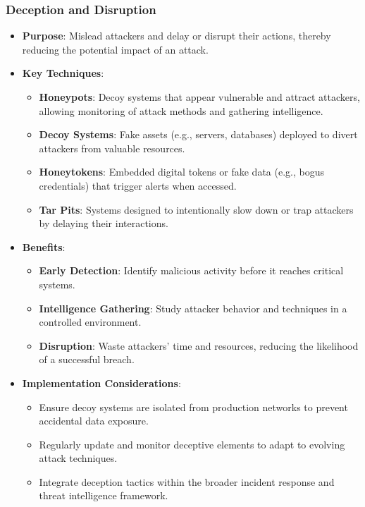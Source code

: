 \documentclass[11pt]{article}
\begin{document}
\subsubsection{Deception and Disruption}
\label{sec:orgede2813}
\begin{itemize}
\item \textbf{Purpose}: Mislead attackers and delay or disrupt their actions, thereby reducing the potential impact of an attack.
\item \textbf{Key Techniques}:
\begin{itemize}
\item \textbf{Honeypots}: Decoy systems that appear vulnerable and attract attackers, allowing monitoring of attack methods and gathering intelligence.
\item \textbf{Decoy Systems}: Fake assets (e.g., servers, databases) deployed to divert attackers from valuable resources.
\item \textbf{Honeytokens}: Embedded digital tokens or fake data (e.g., bogus credentials) that trigger alerts when accessed.
\item \textbf{Tar Pits}: Systems designed to intentionally slow down or trap attackers by delaying their interactions.
\end{itemize}
\item \textbf{Benefits}:
\begin{itemize}
\item \textbf{\textbf{Early Detection}}: Identify malicious activity before it reaches critical systems.
\item \textbf{\textbf{Intelligence Gathering}}: Study attacker behavior and techniques in a controlled environment.
\item \textbf{\textbf{Disruption}}: Waste attackers’ time and resources, reducing the likelihood of a successful breach.
\end{itemize}
\item \textbf{Implementation Considerations}:
\begin{itemize}
\item Ensure decoy systems are isolated from production networks to prevent accidental data exposure.
\item Regularly update and monitor deceptive elements to adapt to evolving attack techniques.
\item Integrate deception tactics within the broader incident response and threat intelligence framework.
\end{itemize}
\end{itemize}
\end{document}
